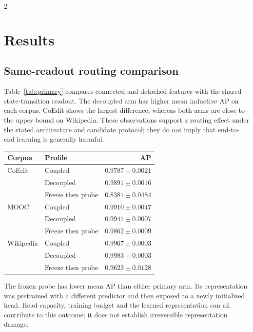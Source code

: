 \documentclass[a4paper,10pt,fleqn]{article}
\renewcommand{\small}{\fontsize{8}{12}\selectfont}
\begin{document}
\begin{multicols}{2}
\section{Results}
\subsection{Same-readout routing comparison}
Table~\ref{tab:primary} compares connected and detached features with the shared state-transition readout. The decoupled arm has higher mean inductive AP on each corpus. CoEdit shows the largest difference, whereas both arms are close to the upper bound on Wikipedia. These observations support a routing effect under the stated architecture and candidate protocol; they do not imply that end-to-end learning is generally harmful.

\begin{center}
\begin{minipage}{\linewidth}\centering
{}\label{tab:primary}
\small
\begin{tabular}{@{}llr@{}}
\toprule
Corpus & Profile & AP\\ \midrule
CoEdit & Coupled & $0.9787\pm0.0021$\\
 & Decoupled & $\mathbf{0.9891\pm0.0016}$\\
 & Freeze then probe & $0.8381\pm0.0484$\\
MOOC & Coupled & $0.9910\pm0.0047$\\
 & Decoupled & $\mathbf{0.9947\pm0.0007}$\\
 & Freeze then probe & $0.9862\pm0.0009$\\
Wikipedia & Coupled & $0.9967\pm0.0003$\\
 & Decoupled & $\mathbf{0.9983\pm0.0003}$\\
 & Freeze then probe & $0.9623\pm0.0128$\\
\bottomrule
\end{tabular}
\end{minipage}
\end{center}


The frozen probe has lower mean AP than either primary arm. Its representation was pretrained with a different predictor and then exposed to a newly initialized head. Head capacity, training budget and the learned representation can all contribute to this outcome; it does not establish irreversible representation damage.


\end{multicols}
\end{document}
